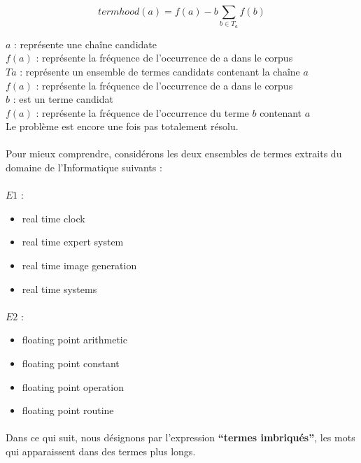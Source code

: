 \documentclass[12pt, a4paper, oneside]{book}
\begin{document}
\begin{equation}
termhood(a) = f(a) - b  \sum_{b \in T_a} f(b)
\end{equation}

$a$ : représente une chaîne candidate\\
$f(a)$ : représente la fréquence de l'occurrence de a dans le corpus\\
$Ta$   : représente un ensemble de termes candidats contenant la chaîne $a$\\
$f(a)$ : représente la fréquence de l'occurrence de a dans le corpus\\
$b$    : est un terme candidat\\
$f(a)$ : représente la fréquence de l'occurrence du terme $b$ contenant $a$\\ 
Le problème est encore une fois pas totalement résolu. 
\paragraph{}
Pour mieux comprendre, considérons les deux ensembles de termes extraits du domaine de l'Informatique suivants : 
\paragraph{}
$E1$ :
\begin{itemize}

\item real time clock
\item real time expert system
\item real time image generation
\item real time systems

\end{itemize}

\paragraph{}
$E2$ : 
\begin{itemize}

\item floating point arithmetic
\item floating point constant
\item floating point operation
\item floating point routine

\end{itemize}

\paragraph{}
Dans ce qui suit, nous désignons par l'expression \textbf{“termes imbriqués”}, les mots qui apparaissent dans des termes plus longs.
\end{document}
